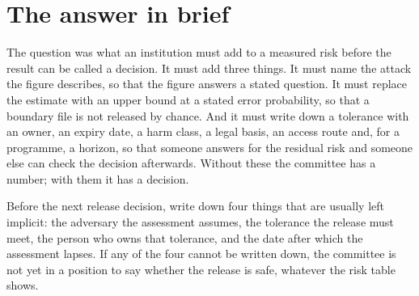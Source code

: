 \section{The answer in brief}

The question was what an institution must add to a measured risk before the result can be
called a decision. It must add three things. It must name the attack the figure describes, so
that the figure answers a stated question. It must replace the estimate with an upper bound
at a stated error probability, so that a boundary file is not released by chance. And it must
write down a tolerance with an owner, an expiry date, a harm class, a legal basis, an access
route and, for a programme, a horizon, so that someone answers for the residual risk and
someone else can check the decision afterwards. Without these the committee has a number;
with them it has a decision.

\begin{inpractice}
Before the next release decision, write down four things that are usually left implicit: the
adversary the assessment assumes, the tolerance the release must meet, the person who owns
that tolerance, and the date after which the assessment lapses. If any of the four cannot be
written down, the committee is not yet in a position to say whether the release is safe,
whatever the risk table shows.
\end{inpractice}
